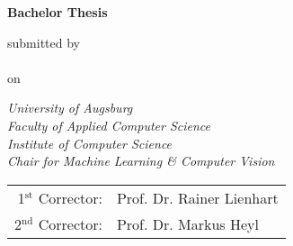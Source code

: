 

\newcommand{\mail}{jonas.kell@student.uni-augsburg.de}



\begin{titlepage}
    
\color{dblue}

\begin{center}
    \vspace*{2cm}
    \Huge
    \textbf{\thetitle}

    \vspace*{1.5cm}
    \color{black}
    \textbf{Bachelor Thesis}

    \vspace*{1cm}
    \normalsize
    submitted by\\
    \LARGE
    \theauthor\\\vspace*{0.3cm}
    \normalsize
    on \thedate

    \vspace{1.8cm}
    \color{black}
    \emph{University of Augsburg}\\
    \emph{Faculty of Applied Computer Science}\\
    \emph{Institute of Computer Science}\\
    \emph{Chair for Machine Learning \& Computer Vision}

    \vfill

    \begin{tabular}{rl}
        1$^\text{st}$ Corrector: &Prof. Dr. Rainer Lienhart\\
        2$^\text{nd}$ Corrector: &Prof. Dr. Markus Heyl\\
    \end{tabular}
\end{center}

\end{titlepage}

